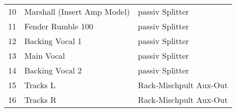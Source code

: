 {\begin{center}
\begin{tabular}{|c|p{3cm}|p{6cm}|}
            \rowcolor{guitarcolor} 10 & Marshall (Insert Amp Model) & passiv Splitter              \\

            \rowcolor{basscolor} 11   & Fender Rumble 100           & passiv Splitter              \\

            \rowcolor{vocalscolor} 12 & Backing Vocal 1             & passiv Splitter              \\
            \rowcolor{vocalscolor} 13 & Main Vocal                  & passiv Splitter              \\
            \rowcolor{vocalscolor} 14 & Backing Vocal 2             & passiv Splitter              \\

            \rowcolor{trackscolor} 15 & Tracks L                    & Rack-Mischpult Aux-Out       \\
            \rowcolor{trackscolor} 16 & Tracks R                    & Rack-Mischpult Aux-Out       \\
            \hline
        \end{tabular}
    \end{center}
}